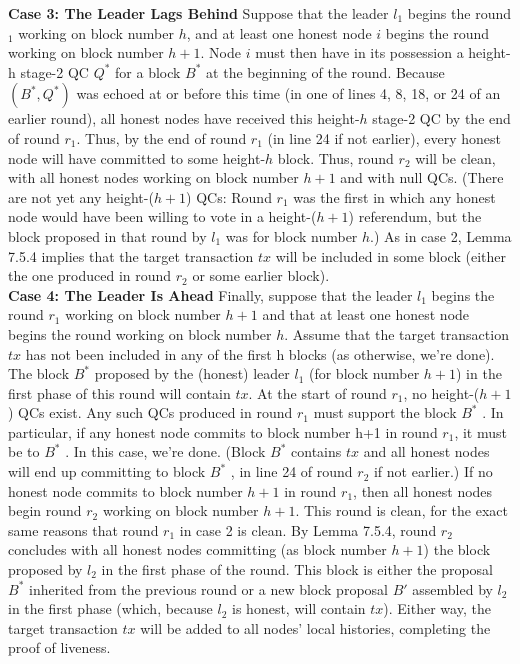 \noindent
\textbf{Case 3: The Leader Lags Behind}
Suppose that the leader $l_1$ begins the round $_1$ working on block number $h$, and at least one
honest node $i$ begins the round working on block number $h + 1$. Node $i$ must then have
in its possession a height-h stage-2 QC $Q^*$
for a block $B^*$ at the beginning of the round.
Because $(B^*, Q^*)$ was echoed at or before this time (in one of lines 4, 8, 18, or 24 of an earlier
round), all honest nodes have received this height-$h$ stage-2 QC by the end of round $r_1$. Thus,
by the end of round $r_1$ (in line 24 if not earlier), every honest node will have committed to
some height-$h$ block. Thus, round $r_2$ will be clean, with all honest nodes working on block
number $h + 1$ and with null QCs. (There are not yet any height-($h + 1$) QCs: Round $r_1$
was the first in which any honest node would have been willing to vote in a height-($h + 1$)
referendum, but the block proposed in that round by $l_1$ was for block number $h$.) As in
case 2, Lemma 7.5.4 implies that the target transaction $tx$ will be included in some block
(either the one produced in round $r_2$ or some earlier block).\\

\noindent
\textbf{Case 4: The Leader Is Ahead}
Finally, suppose that the leader $l_1$ begins the round $r_1$ working on block number $h + 1$ and
that at least one honest node begins the round working on block number $h$. Assume that
the target transaction $tx$ has not been included in any of the first h blocks (as otherwise,
we’re done). The block  $B^*$  proposed by the (honest) leader $l_1$ (for block number $h + 1$) in
the first phase of this round will contain $tx$. At the start of round $r_1$, no height-($h+1$) QCs exist. Any such QCs produced in round $r_1$
must support the block  $B^*$ . In particular, if any honest node commits to block number h+1
in round $r_1$, it must be to  $B^*$ . In this case, we’re done. (Block  $B^*$ 
contains $tx$ and all honest
nodes will end up committing to block  $B^*$ , in line 24 of round $r_2$ if not earlier.)
If no honest node commits to block number $h + 1$ in round $r_1$, then all honest nodes
begin round $r_2$ working on block number $h + 1$. This round is clean, for the exact same
reasons that round $r_1$ in case 2 is clean. By Lemma 7.5.4, round $r_2$ concludes with all honest
nodes committing (as block number $h + 1$) the block proposed by $l_2$ in the first phase of the
round. This block is either the proposal  $B^*$  inherited from the previous round or a new block
proposal $B'$ assembled by $l_2$ in the first phase (which, because $l_2$ is honest, will contain $tx$).
Either way, the target transaction $tx$ will be added to all nodes’ local histories, completing
the proof of liveness.

